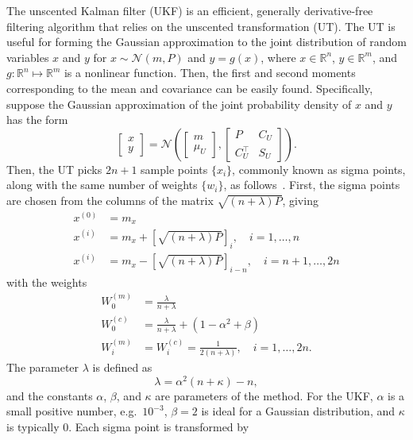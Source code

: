 \documentclass[../zhang_thesis.tex]{subfiles}
\begin{document}
The unscented Kalman filter (UKF) is an efficient, generally derivative-free filtering algorithm that relies on the unscented transformation (UT). The UT is useful for forming the Gaussian approximation to the joint distribution of random variables $x$ and $y$ for $x\sim \mathcal{N}(m,P)$ and $y=g(x)$, where $x\in\mathbb{R}^n$, $y\in\mathbb{R}^m$, and $g:\mathbb{R}^n\mapsto\mathbb{R}^m$ is a nonlinear function. Then, the first and second moments corresponding to the mean and covariance can be
easily found. Specifically, suppose the Gaussian approximation of the joint probability density of $x$ and $y$ has the form
\begin{equation}
    \begin{bmatrix} x \\ y \end{bmatrix} = \mathcal{N} \left( \begin{bmatrix} m \\ \mu_U \end{bmatrix}, \begin{bmatrix} P & C_U \\ C_U^\top & S_U \end{bmatrix} \right).
\end{equation}
Then, the UT picks $2n+1$ sample points $\{x_i\}$, commonly known as sigma points, along with the same number of weights $\{w_i\}$, as follows~\cite{sarkka07}. First, the sigma points are chosen from the columns of the matrix $\sqrt{(n+\lambda)P}$, giving
\begin{align}
    x^{(0)} & = m_x \label{eq:ut1} \\
    x^{(i)} & = m_x + \left[ \sqrt{(n+\lambda)P} \right]_i, \quad i=1,\dots,n \\
    x^{(i)} & = m_x - \left[ \sqrt{(n+\lambda)P} \right]_{i-n}, \quad i=n+1,\dots,2n
\end{align}
with the weights
\begin{align}
    W_0^{(m)} & = \frac{\lambda}{n+\lambda} \\
    W_0^{(c)} & = \frac{\lambda}{n+\lambda} + (1-\alpha^2+\beta) \\
    W_i^{(m)} & = W_i^{(c)} = \frac{1}{2(n+\lambda)}, \quad i=1,\dots,2n. \label{eq:ut2}
\end{align}
The parameter $\lambda$ is defined as
\begin{equation}
    \lambda = \alpha^2 (n+\kappa) - n,
\end{equation}
and the constants $\alpha$, $\beta$, and $\kappa$ are parameters of the method. For the UKF, $\alpha$ is a small positive number, e.g.\ $10^{-3}$, $\beta=2$ is ideal for a Gaussian distribution, and $\kappa$ is typically 0. Each sigma point is transformed by
\end{document}
